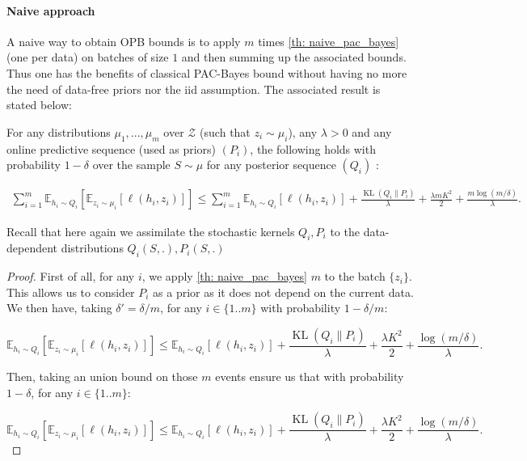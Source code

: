 \begin{noaddcontents}
\paragraph{Naive approach} A naive way to obtain OPB bounds is to apply $m$ times \cref{th: naive_pac_bayes} (one per data) on batches of size $1$ and then summing up the associated bounds. Thus one has the benefits of classical PAC-Bayes bound without having no more the need of data-free priors nor the iid assumption. The associated result is stated below:

\begin{theorem}
  \label{th: naive_approach}
  For any distributions $\mu_1,...,\mu_m$ over $\mathcal{Z}$ (such that $z_i\sim \mu_i$), any $\lambda>0$ and any online predictive sequence (used as priors) $(P_i)$, the following holds with probability $1-\delta$ over the sample $S\sim\mu$ for any posterior sequence $(Q_i)$ :


  \begin{align*}
    \sum_{i=1}^m \mathbb{E}_{h_i\sim Q_{i}}\left[ \mathbb{E}_{z_i\sim \mu_i}[\ell(h_i,z_i)]    \right] \leq \sum_{i=1}^m \mathbb{E}_{h_i\sim Q_{i}}\left[ \ell(h_i,z_i) \right] +
    \frac{\operatorname{KL}(Q_{i}\| P_i)}{\lambda} + \frac{\lambda m K^2}{2} + \frac{m\log(m/\delta)}{\lambda}.
  \end{align*}
\end{theorem}

Recall that here again we assimilate the stochastic kernels $Q_i, P_i$ to the data-dependent distributions $Q_i(S,.), P_i(S,.)$

\begin{proof}
  First of all, for any $i$, we apply \cref{th: naive_pac_bayes} $m$ to the batch $\{ z_i\}$. This allows us to consider $P_i$ as a prior as it does not depend on the current data. We then have, taking $\delta'=\delta/m$, for any $i\in\{1..m\}$ with probability $ 1- \delta/m$:

  \[ \mathbb{E}_{h_i\sim Q_{i}}\left[ \mathbb{E}_{z_i\sim \mu_i}[\ell(h_i,z_i)]    \right] \leq  \mathbb{E}_{h_i\sim Q_{i}}\left[ \ell(h_i,z_i) \right] +
  \frac{\operatorname{KL}(Q_{i}\| P_i)}{\lambda} + \frac{\lambda K^2}{2} + \frac{\log(m/\delta)}{\lambda}. \]

  Then, taking an union bound on those $m$ events ensure us that with probability $1-\delta$, for any $i\in\{1..m\}$:

  \[ \mathbb{E}_{h_i\sim Q_{i}}\left[ \mathbb{E}_{z_i\sim \mu_i}[\ell(h_i,z_i)]    \right] \leq  \mathbb{E}_{h_i\sim Q_{i}}\left[ \ell(h_i,z_i) \right] +
  \frac{\operatorname{KL}(Q_{i}\| P_i)}{\lambda} + \frac{\lambda  K^2}{2} + \frac{\log(m/\delta)}{\lambda}. \]



\end{proof}
\end{noaddcontents}
